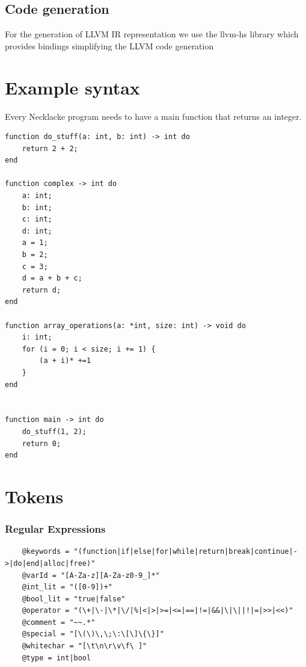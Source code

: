 \documentclass{article}
\begin{document}
\subsection{Code generation}
For the generation of LLVM IR representation we use the llvm-hs library which provides bindings simplifying the LLVM code generation



\section{Example syntax}
Every Necklacke program needs to have a main function that returns an integer.
\begin{verbatim}
function do_stuff(a: int, b: int) -> int do
    return 2 + 2;
end

function complex -> int do
    a: int;
    b: int;
    c: int;
    d: int;
    a = 1;
    b = 2;
    c = 3;
    d = a + b + c;
    return d;
end

function array_operations(a: *int, size: int) -> void do
    i: int;
    for (i = 0; i < size; i += 1) {
        (a + i)* +=1
    }
end


function main -> int do
    do_stuff(1, 2);
    return 0;
end
\end{verbatim}

\section{Tokens}
\subsubsection{Regular Expressions}
\begin{verbatim}
    @keywords = "(function|if|else|for|while|return|break|continue|->|do|end|alloc|free)"
    @varId = "[A-Za-z][A-Za-z0-9_]*"
    @int_lit = "([0-9])+" 
    @bool_lit = "true|false"
    @operator = "(\+|\-|\*|\/|%|<|>|>=|<=|==|!=|&&|\|\||!|=|>>|<<)"
    @comment = "~~.*"
    @special = "[\(\)\,\;\:\[\]\{\}]"
    @whitechar = "[\t\n\r\v\f\ ]"
    @type = int|bool
\end{verbatim}
\end{document}
